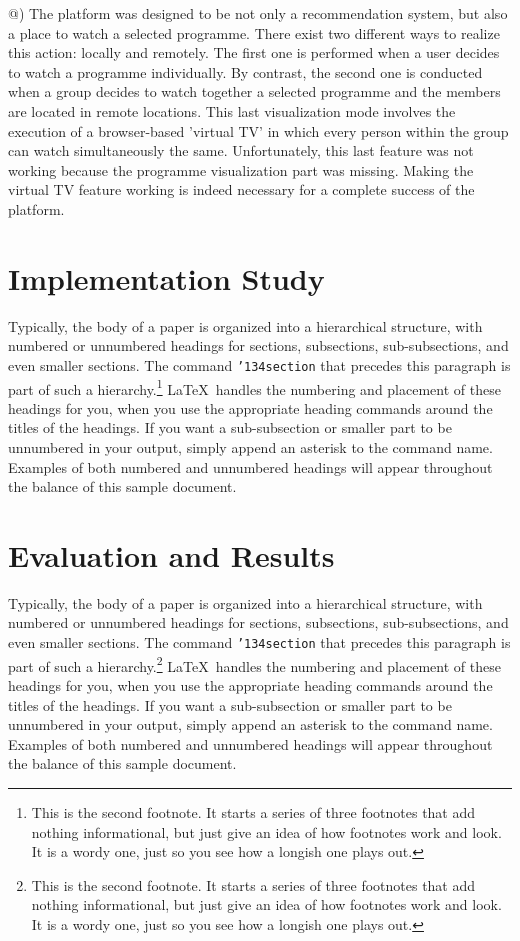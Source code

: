 \documentclass{acm_proc_article-sp}
\makeatletter
\newcommand*{\rom}[1]{\expandafter\@slowromancap\romannumeral #1@}
\makeatother
\begin{document}
\rom{4}) The platform was designed to be not only a recommendation system, but also a place to watch a selected programme. There exist two different ways to realize this action: locally and remotely. 
The first one is performed when a user decides to watch a programme individually. By contrast, the second one is conducted when a group decides to watch together a selected programme and the members are located in remote locations. This last visualization mode involves the execution of a browser-based 'virtual TV' in which every person within the group can watch simultaneously the same. Unfortunately,  this last feature was not working because the programme visualization part was missing. Making the virtual TV feature working is indeed necessary for a complete success of the platform. 


\section{Implementation Study}
Typically, the body of a paper is organized
into a hierarchical structure, with numbered or unnumbered
headings for sections, subsections, sub-subsections, and even
smaller sections.  The command \texttt{{\char'134}section} that
precedes this paragraph is part of such a
hierarchy.\footnote{This is the second footnote.  It
starts a series of three footnotes that add nothing
informational, but just give an idea of how footnotes work
and look. It is a wordy one, just so you see
how a longish one plays out.} \LaTeX\ handles the numbering
and placement of these headings for you, when you use
the appropriate heading commands around the titles
of the headings.  If you want a sub-subsection or
smaller part to be unnumbered in your output, simply append an
asterisk to the command name.  Examples of both
numbered and unnumbered headings will appear throughout the
balance of this sample document.

\section{Evaluation and Results}
Typically, the body of a paper is organized
into a hierarchical structure, with numbered or unnumbered
headings for sections, subsections, sub-subsections, and even
smaller sections.  The command \texttt{{\char'134}section} that
precedes this paragraph is part of such a
hierarchy.\footnote{This is the second footnote.  It
starts a series of three footnotes that add nothing
informational, but just give an idea of how footnotes work
and look. It is a wordy one, just so you see
how a longish one plays out.} \LaTeX\ handles the numbering
and placement of these headings for you, when you use
the appropriate heading commands around the titles
of the headings.  If you want a sub-subsection or
smaller part to be unnumbered in your output, simply append an
asterisk to the command name.  Examples of both
numbered and unnumbered headings will appear throughout the
balance of this sample document.
\end{document}
